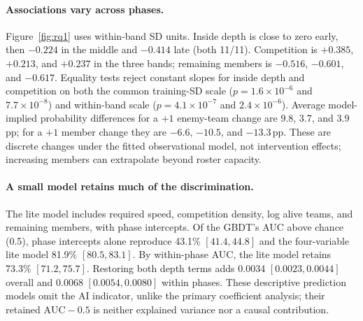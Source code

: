 \documentclass[sigconf,anonymous,nonacm]{acmart}
\begin{document}
\paragraph{Associations vary across phases.}
Figure~\ref{fig:rq1} uses within-band SD units. Inside depth is close to zero early, then $-0.224$ in the middle and $-0.414$ late (both 11/11). Competition is $+0.385$, $+0.213$, and $+0.237$ in the three bands; remaining members is $-0.516$, $-0.601$, and $-0.617$. Equality tests reject constant slopes for inside depth and competition on both the common training-SD scale ($p=1.6\times10^{-6}$ and $7.7\times10^{-8}$) and within-band scale ($p=4.1\times10^{-7}$ and $2.4\times10^{-6}$). Average model-implied probability differences for a $+1$ enemy-team change are 9.8, 3.7, and 3.9\,pp; for a $+1$ member change they are $-6.6$, $-10.5$, and $-13.3$\,pp. These are discrete changes under the fitted observational model, not intervention effects; increasing members can extrapolate beyond roster capacity.

\paragraph{A small model retains much of the discrimination.}
The lite model includes required speed, competition density, log alive teams, and remaining members, with phase intercepts.
Of the GBDT's AUC above chance (0.5), phase intercepts alone reproduce 43.1\% $[41.4,\allowbreak 44.8]$ and the four-variable lite model 81.9\% $[80.5,\allowbreak 83.1]$. By within-phase AUC, the lite model retains 73.3\% $[71.2,\allowbreak 75.7]$. Restoring both depth terms adds 0.0034 $[0.0023,\allowbreak 0.0044]$ overall and 0.0068 $[0.0054,\allowbreak 0.0080]$ within phases. These descriptive prediction models omit the AI indicator, unlike the primary coefficient analysis; their retained $\mathrm{AUC}-0.5$ is neither explained variance nor a causal contribution.
\end{document}
